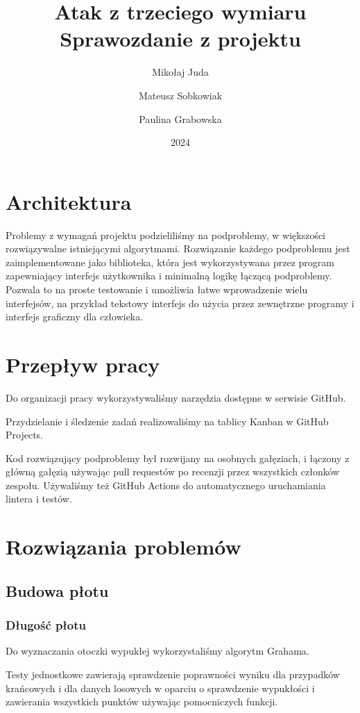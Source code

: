 \documentclass{article}
\title{Atak z trzeciego wymiaru \\\large Sprawozdanie z projektu}
\author{Mikołaj Juda \and Mateusz Sobkowiak \and Paulina Grabowska}
\date{2024}
\begin{document}
\maketitle

\section{Architektura}
Problemy z wymagań projektu podzieliliśmy na podproblemy, w większości
rozwiązywalne istniejącymi algorytmami.
Rozwiązanie każdego podproblemu jest zaimplementowane jako biblioteka,
która jest wykorzystywana przez program zapewniający interfejs użytkownika
i minimalną logikę łączącą podproblemy. Pozwala to na proste testowanie
i umożliwia łatwe wprowadzenie wielu interfejsów, na przykład
tekstowy interfejs do użycia przez zewnętrzne programy i interfejs graficzny dla człowieka.

\section{Przepływ pracy}
Do organizacji pracy wykorzystywaliśmy narzędzia dostępne w serwisie GitHub.

\noindent Przydzielanie i śledzenie zadań realizowaliśmy na tablicy Kanban w GitHub Projects.

\noindent Kod rozwiązujący podproblemy był rozwijany na osobnych gałęziach,
i łączony z główną gałęzią używając pull requestów po recenzji przez wszystkich członków zespołu.
Używaliśmy też GitHub Actions do automatycznego uruchamiania lintera i testów.

\section{Rozwiązania problemów}

\subsection{Budowa płotu}

\subsubsection{Długość płotu}
Do wyznaczania otoczki wypukłej wykorzystaliśmy algorytm Grahama.

\noindent Testy jednostkowe zawierają sprawdzenie poprawności wyniku dla przypadków krańcowych
i dla danych losowych w oparciu o sprawdzenie wypukłości i zawierania wszystkich punktów
używając pomocniczych funkcji.
\end{document}
